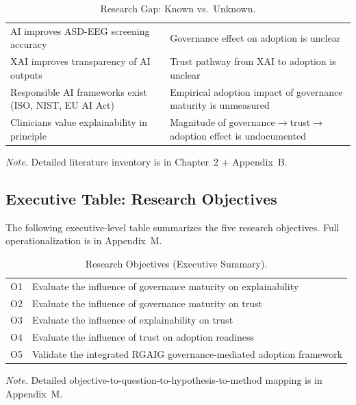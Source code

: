 {\tablestripes\tablefontsize
{}
\begin{xltabular}{\textwidth}{@{} >{\raggedright\arraybackslash}p{6cm} L @{}}
\caption[Research Gap: Known vs.\ Unknown]{Research Gap: Known vs.\ Unknown.}\label{tab:exec_research_gap} \\
\toprule
{} &  \\
\midrule
\endfirsthead
\endhead
\bottomrule
\endlastfoot
AI improves ASD-EEG screening accuracy & Governance effect on adoption is unclear \\
\addlinespace
XAI improves transparency of AI outputs & Trust pathway from XAI to adoption is unclear \\
\addlinespace
Responsible AI frameworks exist (ISO, NIST, EU AI Act) & Empirical adoption impact of governance maturity is unmeasured \\
\addlinespace
Clinicians value explainability in principle & Magnitude of governance$\rightarrow$trust$\rightarrow$adoption effect is undocumented \\
\end{xltabular}}
\vspace{0.3em}\noindent\textit{Note.} Detailed literature inventory is in Chapter~2 + Appendix~B.


\subsection{Executive Table: Research Objectives}
\label{sec:exec_objectives}

\noindent The following executive-level table summarizes the five research objectives. Full operationalization is in Appendix~M.

{\tablestripes\tablefontsize
{}
\begin{xltabular}{\textwidth}{@{} >{\raggedright\arraybackslash}p{6cm} L @{}}
\caption[Research Objectives (Executive Summary)]{Research Objectives (Executive Summary).}\label{tab:exec_objectives} \\
\toprule
{} &  \\
\midrule
\endfirsthead
\endhead
\bottomrule
\endlastfoot
O1 & Evaluate the influence of governance maturity on explainability \\
\addlinespace
O2 & Evaluate the influence of governance maturity on trust \\
\addlinespace
O3 & Evaluate the influence of explainability on trust \\
\addlinespace
O4 & Evaluate the influence of trust on adoption readiness \\
\addlinespace
O5 & Validate the integrated RGAIG governance-mediated adoption framework \\
\end{xltabular}}
\vspace{0.3em}\noindent\textit{Note.} Detailed objective-to-question-to-hypothesis-to-method mapping is in Appendix~M.



